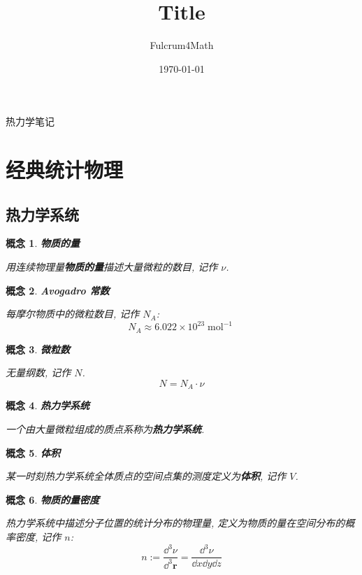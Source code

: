 \documentclass[UTF8]{ctexart}
\title{Title}
\author{Fulcrum4Math}
\date{\today}
\newcommand{\<}{\langle}
\renewcommand{\>}{\rangle}                              %
\newenvironment{dfn_box}{
    \begin{tcolorbox}[enhanced, colback=dfn_green2, boxrule=0pt, frame hidden,
        borderline west={0.7mm}{0.1mm}{dfn_green1},breakable]
    }
    {\end{tcolorbox}}
\theoremstyle{MyStyle} %
\newtheorem{definition}{概念}[subsection]
\newenvironment{cpt}{\begin{dfn_box}\begin{definition}}{\end{definition}\end{dfn_box}}
\DeclareMathOperator{\mol}{\mathrm{mol}}
\begin{document}
\begin{center}
    {\LARGE 热力学笔记}
\end{center}

\section{经典统计物理}

    \subsection{热力学系统}
        
        \begin{cpt}
            \textbf{物质的量}

            用连续物理量\textbf{物质的量}描述大量微粒的数目, 记作 \(\nu\). 
        \end{cpt}
        
        \begin{cpt}
            \textbf{Avogadro 常数}

            每摩尔物质中的微粒数目, 记作 \(N_A\): 
            \[N_A\approx 6.022\times 10^{23}\mol^{-1}\]
        \end{cpt}
        
        \begin{cpt}
            \textbf{微粒数}

            无量纲数, 记作 \(N\). 
            \[N=N_A\cdot\nu\]
        \end{cpt}
        
        \begin{cpt}
            \textbf{热力学系统}

            一个由大量微粒组成的质点系称为\textbf{热力学系统}. 
        \end{cpt}
    
        \begin{cpt}
            \textbf{体积}

            某一时刻热力学系统全体质点的空间点集的测度定义为\textbf{体积}, 记作 \(V\). 
        \end{cpt}
        
        \begin{cpt}
            \textbf{物质的量密度}

            热力学系统中描述分子位置的统计分布的物理量, 定义为物质的量在空间分布的概率密度, 记作 \(n\): 
            \[n:=\frac{\dd^3\nu}{\dd^3\bm{r}}=\frac{\dd^3\nu}{\dd x\dd y\dd z}\]
        \end{cpt}
        
\end{document}

